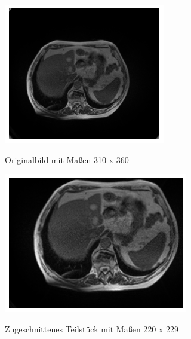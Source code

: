\begin{figure}[H]
    \begin{minipage}{0.45\textwidth}
    \centering
    \includegraphics[width=1\linewidth]{LaTex/bilder/orig.png}
    \caption{Originalbild mit Maßen 310 x 360}
    \end{minipage}\hfill
    \begin{minipage}{0.45\textwidth}
    \includegraphics[width=1\linewidth]{LaTex/bilder/crop.png}
    \caption{Zugeschnittenes Teilstück mit Maßen 220 x 229}
    \end{minipage}
    \centering\label{fig:clean-data}
\end{figure}

